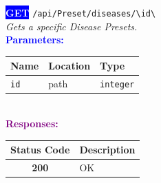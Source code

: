 \begin{tcolorbox}[
    colback=blue!5,
    colframe=blue,
    arc=2mm,
    boxrule=1pt,
    left=5pt,
    right=5pt,
    top=5pt,
    bottom=5pt
]
\noindent\colorbox{blue}{\textcolor{white}{\textbf{GET}}} 
\texttt{\large /api/Preset/diseases/\textbackslash{}{id\textbackslash{}}}\\[0.3em]
\textit{Gets a specific Disease Presets.}\\[0.3em]
\vspace{0.3em}
\textbf{\textcolor{blue}{Parameters:}}\\[0.2em]
\begin{tabular}{|l|l|l|}
\hline
\rowcolor{gray!20}
\textbf{Name} & \textbf{Location} & \textbf{Type} \\ \hline
\texttt{id} & path & \texttt{integer} \\ \hline
\end{tabular}\\[0.5em]
\vspace{0.3em}
\textbf{\textcolor{purple}{Responses:}}\\[0.2em]
\begin{tabular}{|c|p{10cm}|}
\hline
\rowcolor{gray!20}
\textbf{Status Code} & \textbf{Description} \\ \hline
\colorbox{green!20}{\textbf{200}} & OK \\ \hline
\end{tabular}
\end{tcolorbox}
\vspace{0.5em}

